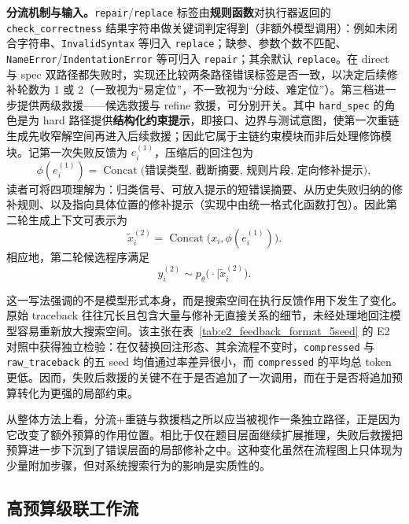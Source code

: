 \textbf{分流机制与输入。}\texttt{repair}/\texttt{replace} 标签由\textbf{规则函数}对执行器返回的 \texttt{check\_correctness} 结果字符串做关键词判定得到（非额外模型调用）：例如未闭合字符串、\texttt{InvalidSyntax} 等归入 \texttt{replace}；缺参、参数个数不匹配、\texttt{NameError}/\texttt{IndentationError} 等可归入 \texttt{repair}；其余默认 \texttt{replace}。在 direct 与 spec 双路径都失败时，实现还比较两条路径错误标签是否一致，以决定后续修补轮数为 1 或 2（一致视为“易定位”，不一致视为“分歧、难定位”）。第三档进一步提供两级救援——候选救援与 refine 救援，可分别开关。其中 \texttt{hard\_spec} 的角色是为 hard 路径提供\textbf{结构化约束提示}，即接口、边界与测试意图，使第一次重链生成先收窄解空间再进入后续救援；因此它属于主链约束模块而非后处理修饰模块。记第一次失败反馈为 $e_i^{(1)}$，压缩后的回注包为
\begin{equation}
\phi(e_i^{(1)})=\operatorname{Concat}\bigl(
\textit{错误类型},\,
\textit{截断摘要},\,
\textit{规则片段},\,
\textit{定向修补提示}
\bigr),
\end{equation}
读者可将四项理解为：归类信号、可放入提示的短错误摘要、从历史失败归纳的修补规则、以及指向具体位置的修补提示（实现中由统一格式化函数打包）。因此第二轮生成上下文可表示为
\begin{equation}
\tilde{x}_i^{(2)}=\operatorname{Concat}\bigl(x_i,\phi(e_i^{(1)})\bigr).
\end{equation}
相应地，第二轮候选程序满足
\begin{equation}
y_i^{(2)} \sim p_{\theta}\bigl(\cdot \mid \tilde{x}_i^{(2)}\bigr).
\end{equation}

这一写法强调的不是模型形式本身，而是搜索空间在执行反馈作用下发生了变化。原始 traceback 往往冗长且包含大量与修补无直接关系的细节，未经处理地回注模型容易重新放大搜索空间。该主张在表~\ref{tab:e2_feedback_format_5seed} 的 E2 对照中获得独立检验：在仅替换回注形态、其余流程不变时，\texttt{compressed} 与 \texttt{raw\_traceback} 的五 seed 均值通过率差异很小，而 \texttt{compressed} 的平均总 token 更低。因而，失败后救援的关键不在于是否追加了一次调用，而在于是否将追加预算转化为更强的局部约束。

从整体方法上看，分流+重链与救援档之所以应当被视作一条独立路径，正是因为它改变了额外预算的作用位置。相比于仅在题目层面继续扩展推理，失败后救援把预算进一步下沉到了错误层面的局部修补之中。这种变化虽然在流程图上只体现为少量附加步骤，但对系统搜索行为的影响是实质性的。



\subsection{高预算级联工作流}
\label{sec:cascade}

